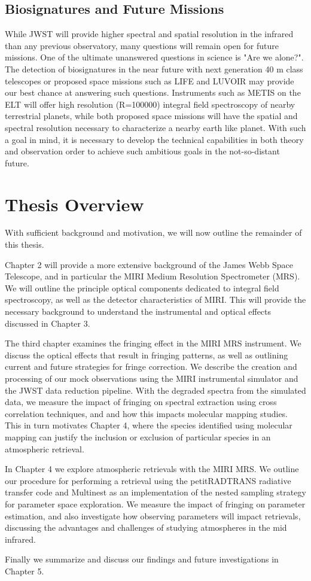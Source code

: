 \subsection{Biosignatures and Future Missions}
While JWST will provide higher spectral and spatial resolution in the infrared than any previous observatory, many questions will remain open for future missions.
One of the ultimate unanswered questions in science is "Are we alone?".
The detection of biosignatures in the near future with next generation 40 m class telescopes \parencite{Lopez-Morales2019} or proposed space missions such as LIFE \parencite{Quanz2019} and LUVOIR \parencite{Luvoir2019} may provide our best chance at answering such questions.
Instruments such as METIS on the ELT will offer high resolution (R=100000) integral field spectroscopy of nearby terrestrial planets, while both proposed space missions will have the spatial and spectral resolution necessary to characterize a nearby earth like planet.
With such a goal in mind, it is necessary to develop the technical capabilities in both theory and observation order to achieve such ambitious goals in the not-so-distant future.

\section{Thesis Overview}
With sufficient background and motivation, we will now outline the remainder of this thesis.

Chapter 2 will provide a more extensive background of the James Webb Space Telescope, and in particular the MIRI Medium Resolution Spectrometer (MRS).
We will outline the principle optical components dedicated to integral field spectroscopy, as well as the detector characteristics of MIRI.
This will provide the necessary background to understand the instrumental and optical effects discussed in Chapter 3.

The third chapter examines the fringing effect in the MIRI MRS instrument.
We discuss the optical effects that result in fringing patterns, as well as outlining current and future strategies for fringe correction.
We describe the creation and processing of our mock observations using the MIRI instrumental simulator and the JWST data reduction pipeline.
With the degraded spectra from the simulated data, we measure the impact of fringing on spectral extraction using cross correlation techniques, and and how this impacts molecular mapping studies.
This in turn motivates Chapter 4, where the species identified using molecular mapping can justify the inclusion or exclusion of particular species in an atmospheric retrieval.

In Chapter 4 we explore atmospheric retrievals with the MIRI MRS.
We outline our procedure for performing a retrieval using the petitRADTRANS radiative transfer code and Multinest as an implementation of the nested sampling strategy for parameter space exploration.
We measure the impact of fringing on parameter estimation, and also investigate how observing parameters will impact retrievals, discussing the advantages and challenges of studying atmospheres in the mid infrared.

Finally we summarize and discuss our findings and future investigations in Chapter 5.

